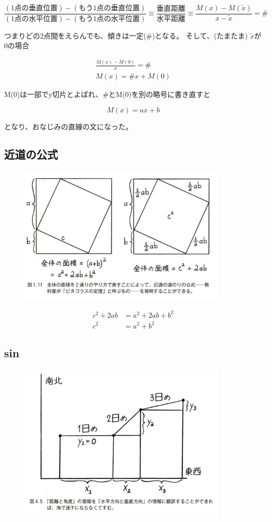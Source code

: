 \documentclass[dvipdfmx]{jsarticle}
\begin{document}
\[ \frac{(1点の垂直位置) - (もう1点の垂直位置)}{(1点の水平位置) - (もう1点の水平位置)} \equiv \frac{垂直距離}{水平距離} \equiv \frac{M(x) - M(\tilde{x})}{x - \tilde{x}}  = \# \]

つまりどの2点間をえらんでも、傾きは一定(\#)となる。 そして、(たまたま) $\tilde{x}$が0の場合

\begin{align*}
  \frac{M(x) - M(0)}{x} = \# \\
  M(x) = \#x + M(0)
\end{align*}

M(0)は一部でy切片とよばれ、\#とM(0)を別の略号に書き直すと

\[ M(x) = ax + b \]

となり、おなじみの直線の文になった。

\subsection{近道の公式}

\begin{figure}[h]
  \centering
  \includegraphics[width=10cm]{images/burn_math_1-11.png}
\end{figure}

\begin{align*}
  c^2 + 2ab &= a^2 + 2ab + b^2 \\
  c^2 &= a^2 + b^2
\end{align*}

\subsection{sin}

\begin{figure}[h]
  \centering
  \includegraphics[width=10cm]{images/burn_math_4-5.png}
\end{figure}
\end{document}

